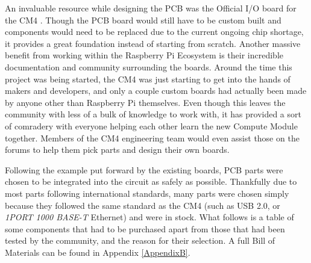 An invaluable resource while designing the PCB was the Official I/O board for the CM4 \cite{rpi_cm4_io}.
Though the PCB board would still have to be custom built and components would need to be replaced due to the current ongoing chip shortage, it provides a great foundation instead of starting from scratch.
Another massive benefit from working within the Raspberry Pi Ecosystem is their incredible documentation and community surrounding the boards.
Around the time this project was being started, the CM4 was just starting to get into the hands of makers and developers, and only a couple custom boards had actually been made by anyone other than Raspberry Pi themselves.
Even though this leaves the community with less of a bulk of knowledge to work with, it has provided a sort of comradery with everyone helping each other learn the new Compute Module together.
Members of the CM4 engineering team would even assist those on the forums to help them pick parts and design their own boards.

Following the example put forward by the existing boards, PCB parts were chosen to be integrated into the circuit as safely as possible.
Thankfully due to most parts following international standards, many parts were chosen simply because they followed the same standard as the CM4 (such as USB 2.0, or \emph{1PORT 1000 BASE-T} Ethernet) and were in stock.
What follows is a table of some components that had to be purchased apart from those that had been tested by the community, and the reason for their selection.
A full Bill of Materials can be found in Appendix \ref{AppendixB}.


